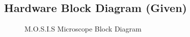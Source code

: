 \subsection{Hardware Block Diagram (Given)}
\begin{figure}[H]
  \begin{center}
    
  \caption{M.O.S.I.S Microscope Block Diagram}
  \end{center}
\end{figure}